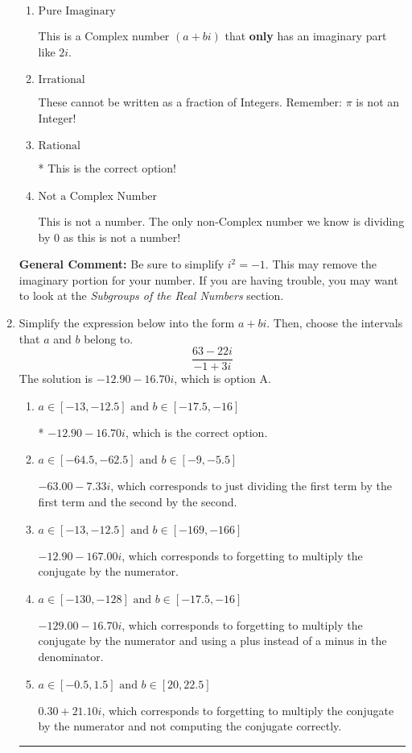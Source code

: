 \documentclass{extbook}[14pt]
\newcommand{\litem}[1]{\item #1

\rule{\textwidth}{0.4pt}}
\begin{document}
\begin{enumerate}
{\begin{enumerate}[label=\Alph*.]
This is a Complex number $(a+bi)$ that is not Real (has $i$ as part of the number).
\item \( \text{Pure Imaginary} \)

This is a Complex number $(a+bi)$ that \textbf{only} has an imaginary part like $2i$.
\item \( \text{Irrational} \)

These cannot be written as a fraction of Integers. Remember: $\pi$ is not an Integer!
\item \( \text{Rational} \)

* This is the correct option!
\item \( \text{Not a Complex Number} \)

This is not a number. The only non-Complex number we know is dividing by 0 as this is not a number!
\end{enumerate}

\textbf{General Comment:} Be sure to simplify $i^2 = -1$. This may remove the imaginary portion for your number. If you are having trouble, you may want to look at the \textit{Subgroups of the Real Numbers} section.
}
\litem{
Simplify the expression below into the form $a+bi$. Then, choose the intervals that $a$ and $b$ belong to.
\[ \frac{63 - 22 i}{-1 + 3 i} \]The solution is \( -12.90  - 16.70 i \), which is option A.\begin{enumerate}[label=\Alph*.]
\item \( a \in [-13, -12.5] \text{ and } b \in [-17.5, -16] \)

* $-12.90  - 16.70 i$, which is the correct option.
\item \( a \in [-64.5, -62.5] \text{ and } b \in [-9, -5.5] \)

 $-63.00  - 7.33 i$, which corresponds to just dividing the first term by the first term and the second by the second.
\item \( a \in [-13, -12.5] \text{ and } b \in [-169, -166] \)

 $-12.90  - 167.00 i$, which corresponds to forgetting to multiply the conjugate by the numerator.
\item \( a \in [-130, -128] \text{ and } b \in [-17.5, -16] \)

 $-129.00  - 16.70 i$, which corresponds to forgetting to multiply the conjugate by the numerator and using a plus instead of a minus in the denominator.
\item \( a \in [-0.5, 1.5] \text{ and } b \in [20, 22.5] \)

 $0.30  + 21.10 i$, which corresponds to forgetting to multiply the conjugate by the numerator and not computing the conjugate correctly.
\end{enumerate}

}
\end{enumerate}
\end{document}

